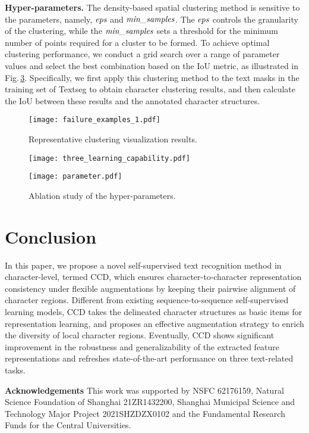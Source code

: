 \documentclass[10pt,twocolumn,letterpaper]{article}
\begin{document}
\noindent \textbf{Hyper-parameters.} \label{Hyper-parameter}
The density-based spatial clustering method is sensitive to the parameters, namely, $\emph{eps}$ and $\emph{min\_samples}$. The $\emph{eps}$ controls the granularity of the clustering, while the $\emph{min\_samples}$ sets a threshold for the minimum number of points required for a cluster to be formed.
To achieve optimal clustering performance, we conduct a grid search over a range of parameter values and select the best combination based on the IoU metric, as illustrated in Fig.\,\ref{Figs.parameter}. Specifically, we first apply this clustering method to the text masks in the training set of Textseg to obtain character clustering results, and then calculate the IoU between these results and the annotated character structures.

\begin{figure}[t]
\centering
\graphicspath{{./graph/}}
\texttt{[image: failure\_examples\_1.pdf]}
\caption{Representative clustering visualization results.}
\label{Figs.failure_examples}
\end{figure}

\begin{figure}[t]
  \centering
  \graphicspath{{./graph/}}
  \texttt{[image: three\_learning\_capability.pdf]}
  \caption{}
  \label{Figs.three_learning_capability}
\end{figure}

\begin{figure}[t]
  \centering
  \graphicspath{{./graph/}}
  \texttt{[image: parameter.pdf]}
  \caption{Ablation study of the hyper-parameters.}
  \label{Figs.parameter}
\end{figure}

\section{Conclusion}
In this paper, we propose a novel self-supervised text recognition method in character-level, termed CCD, which ensures character-to-character representation consistency under flexible augmentations by keeping their pairwise alignment of character regions.
Different from existing sequence-to-sequence self-supervised learning models, CCD takes the delineated character structures as basic items for representation learning, and proposes an effective augmentation strategy to enrich the diversity of local character regions. Eventually, CCD shows significant improvement in the robustness and generalizability of the extracted feature representations and refreshes state-of-the-art performance on three text-related tasks. 

\noindent \textbf{Acknowledgements} This work was supported by NSFC 62176159, Natural Science Foundation of Shanghai 21ZR1432200, Shanghai Municipal Science and Technology Major Project 2021SHZDZX0102 and the Fundamental Research Funds for the Central Universities.

\newpage
{\small


}
\end{document}
